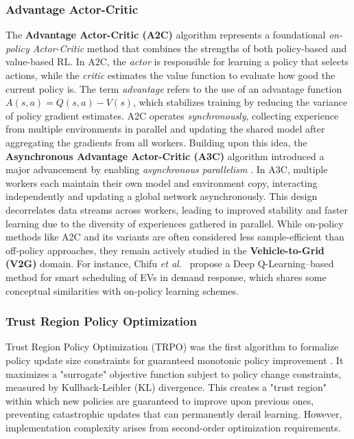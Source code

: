 \subsubsection{Advantage Actor-Critic}
\noindent
The \textbf{Advantage Actor-Critic (A2C)} algorithm represents a foundational \textit{on-policy Actor-Critic} method that combines the strengths of both policy-based and value-based RL. 
In A2C, the \textit{actor} is responsible for learning a policy that selects actions, while the \textit{critic} estimates the value function to evaluate how good the current policy is. 
The term \textit{advantage} refers to the use of an advantage function \( A(s, a) = Q(s, a) - V(s) \), which stabilizes training by reducing the variance of policy gradient estimates. 
A2C operates \textit{synchronously}, collecting experience from multiple environments in parallel and updating the shared model after aggregating the gradients from all workers.
Building upon this idea, the \textbf{Asynchronous Advantage Actor-Critic (A3C)} algorithm introduced a major advancement by enabling \textit{asynchronous parallelism} \cite{mnih2016asynchronous}. 
In A3C, multiple workers each maintain their own model and environment copy, interacting independently and updating a global network asynchronously. 
This design decorrelates data streams across workers, leading to improved stability and faster learning due to the diversity of experiences gathered in parallel.
While on-policy methods like A2C and its variants are often considered less sample-efficient than off-policy approaches, they remain actively studied in the \textbf{Vehicle-to-Grid (V2G)} domain. 
For instance, Chifu \textit{et al.}~\cite{chifu2024deep} propose a Deep Q-Learning--based method for smart scheduling of EVs in demand response, which shares some conceptual similarities with on-policy learning schemes.

\subsubsection{Trust Region Policy Optimization}

Trust Region Policy Optimization (TRPO) was the first algorithm to formalize policy update size constraints for guaranteed monotonic policy improvement \cite{schulman2020trust}. It maximizes a "surrogate" objective function subject to policy change constraints, measured by Kullback-Leibler (KL) divergence. This creates a "trust region" within which new policies are guaranteed to improve upon previous ones, preventing catastrophic updates that can permanently derail learning. However, implementation complexity arises from second-order optimization requirements.

